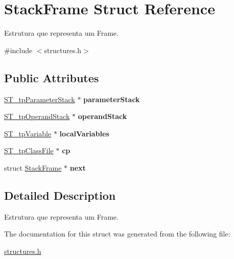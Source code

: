 \hypertarget{structStackFrame}{}\section{Stack\+Frame Struct Reference}
\label{structStackFrame}


Estrutura que representa um Frame.  




{\ttfamily \#include $<$structures.\+h$>$}

\subsection*{Public Attributes}
\begin{DoxyCompactItemize}
\item 
\mbox{\label{structStackFrame_af8f5721e0753bd0105b4ab8fa361df1a}} 
\mbox{\hyperlink{structures_8h_ae2d273f61e0f30cd3071067bff6987ce}{S\+T\+\_\+tp\+Parameter\+Stack}} $\ast$ {\bfseries parameter\+Stack}
\item 
\mbox{\label{structStackFrame_a22eadf906765d591df387712ee263442}} 
\mbox{\hyperlink{structures_8h_a2da65ddc00e0495a51dcce6007aedfb7}{S\+T\+\_\+tp\+Operand\+Stack}} $\ast$ {\bfseries operand\+Stack}
\item 
\mbox{\label{structStackFrame_a1afeb78d4eccd565e391a3993bebc4e7}} 
\mbox{\hyperlink{structVariable}{S\+T\+\_\+tp\+Variable}} $\ast$ {\bfseries local\+Variables}
\item 
\mbox{\label{structStackFrame_a269d036c1e2ac466d5873afc69652f20}} 
\mbox{\hyperlink{structures_8h_a300c8e4693c608a0fc0d5f210b5448b5}{S\+T\+\_\+tp\+Class\+File}} $\ast$ {\bfseries cp}
\item 
\mbox{\label{structStackFrame_a3cb6ca230d221991df6c9f554aa7a43b}} 
struct \mbox{\hyperlink{structStackFrame}{Stack\+Frame}} $\ast$ {\bfseries next}
\end{DoxyCompactItemize}


\subsection{Detailed Description}
Estrutura que representa um Frame. 

The documentation for this struct was generated from the following file\+:\begin{DoxyCompactItemize}
\item 
\mbox{\hyperlink{structures_8h}{structures.\+h}}\end{DoxyCompactItemize}
